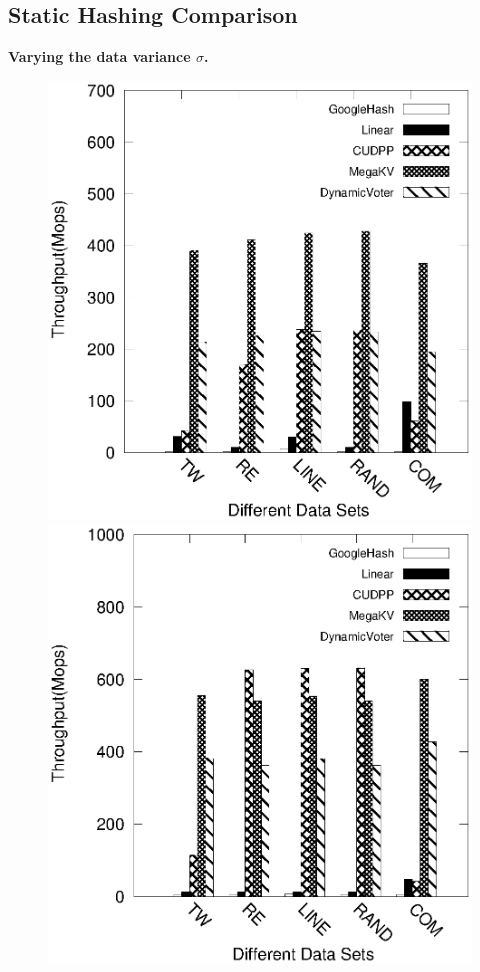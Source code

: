 \subsection{Static Hashing Comparison}\label{sec:exp:static}
\vspace{1mm}\noindent\textbf{Varying the data variance $\sigma$.}

\begin{figure}[h]
	\begin{minipage}{0.45\linewidth}\centering
	\includegraphics[width=\linewidth]{pic/static/static_insert.eps}
	\centerline{}
	\end{minipage}
	\hfill
	\begin{minipage}{0.45\linewidth}\centering
	\includegraphics[width=\linewidth]{pic/static/static_search.eps}

\end{minipage}
\end{figure}
